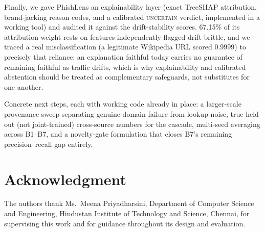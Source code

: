 \documentclass[conference]{IEEEtran}
\begin{document}
Finally, we gave PhishLens an explainability layer (exact TreeSHAP attribution,
brand-jacking reason codes, and a calibrated \textsc{uncertain} verdict,
implemented in a working tool) and audited it against the drift-stability
scores. 67.15\% of its attribution weight
rests on features independently flagged drift-brittle, and we traced a
real misclassification (a legitimate Wikipedia URL scored 0.9999) to
precisely that reliance: an explanation faithful today carries no
guarantee of remaining faithful as traffic drifts, which is why
explainability and calibrated abstention should be treated as
complementary safeguards, not substitutes for one another.

Concrete next steps, each with working code already in place: a
larger-scale provenance sweep separating genuine domain failure from
lookup noise, true held-out (not joint-trained) cross-source numbers for
the cascade, multi-seed averaging across B1--B7, and a novelty-gate
formulation that closes B7's remaining precision--recall gap entirely.

\section*{Acknowledgment}

The authors thank Ms.\ Meena Priyadharsini, Department of Computer
Science and Engineering, Hindustan Institute of Technology and Science,
Chennai, for supervising this work and for guidance throughout its
design and evaluation.



\end{document}
